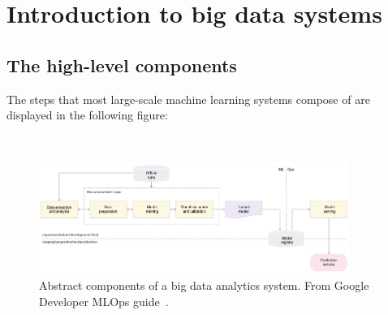 \section{Introduction to big data systems}




\subsection{The high-level components}




The steps that most large-scale machine learning systems compose of are displayed in the following figure: 

\begin{figure}[ht]
\ \newline
\begin{center}
\includegraphics[width=0.9\textwidth]{simplegoogle.png}
\caption{Abstract components of a big data analytics system. From Google Developer MLOps guide~\cite{googlemlops}.}
\label{simplepipeline}
\end{center}
\end{figure}


